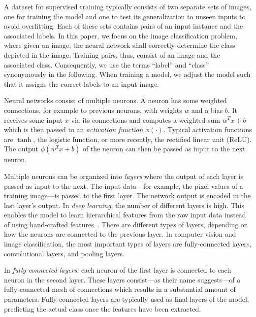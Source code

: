 \documentclass[conference]{IEEEtran}
\begin{document}
A dataset for supervised training typically consists of two separate sets of images, one for training the model and one to test its generalization to unseen inputs to avoid overfitting.
Each of these sets contains pairs of an input instance and the associated labels.
In this paper, we focus on the image classification problem, where given an image, the neural network shall correctly determine the class depicted in the image.
Training pairs, thus, consist of an image and the associated class.
Consequently, we use the terms ``label'' and ``class'' synonymously in the following.
When training a model, we adjust the model such that it assigns the correct labels to an input image.

Neural networks consist of multiple neurons.
A neuron has some weighted connections, for example to previous neurons, with weights $w$ and a bias $b$.
It receives some input $x$ via its connections and computes a weighted sum $w^Tx+b$ which is then passed to an \emph{activation function} $\phi(\cdot)$.
Typical activation functions are $\tanh$, the logistic function, or more recently, the rectified linear unit (ReLU).
The output $\phi(w^Tx+b)$ of the neuron can then be passed as input to the next neuron.

Multiple neurons can be organized into \emph{layers} where the output of each layer is passed as input to the next.
The input data---for example, the pixel values of a training image---is passed to the first layer.
The network output is encoded in the last layer's output.
%
In \emph{deep learning}, the number of different layers is high.
This enables the model to learn hierarchical features from the raw input data instead of using hand-crafted features~\cite{chilimbi2014-Project-Adam}.
%
There are different types of layers, depending on how the neurons are connected to the previous layer.
In computer vision and image classification, the most important types of layers are fully-connected layers, convolutional layers, and pooling layers.

In \emph{fully-connected layers}, each neuron of the first layer is connected to each neuron in the second layer.
These layers consist---as their name suggests---of a fully-connected mesh of connections which results in a substantial amount of parameters.
Fully-connected layers are typically used as final layers of the model, predicting the actual class once the features have been extracted.
\end{document}
